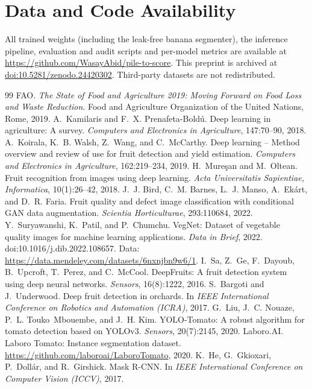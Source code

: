 \documentclass[10pt,twocolumn]{article}
\begin{document}
\section*{Data and Code Availability}
All trained weights (including the leak-free banana segmenter), the inference pipeline, evaluation and audit scripts and per-model metrics are available at \url{https://github.com/WasayAbid/pile-to-score}. This preprint is archived at \href{https://doi.org/10.5281/zenodo.24420302}{doi:10.5281/zenodo.24420302}. Third-party datasets are not redistributed.

\small
\begin{thebibliography}{99}
 FAO. \emph{The State of Food and Agriculture 2019: Moving Forward on Food Loss and Waste Reduction}. Food and Agriculture Organization of the United Nations, Rome, 2019.
 A.~Kamilaris and F.~X. Prenafeta-Bold\'u. Deep learning in agriculture: A survey. \emph{Computers and Electronics in Agriculture}, 147:70--90, 2018.
 A.~Koirala, K.~B. Walsh, Z.~Wang, and C.~McCarthy. Deep learning -- Method overview and review of use for fruit detection and yield estimation. \emph{Computers and Electronics in Agriculture}, 162:219--234, 2019.
 H.~Mure\c{s}an and M.~Oltean. Fruit recognition from images using deep learning. \emph{Acta Universitatis Sapientiae, Informatica}, 10(1):26--42, 2018.
 J.~J. Bird, C.~M. Barnes, L.~J. Manso, A.~Ek\'art, and D.~R. Faria. Fruit quality and defect image classification with conditional GAN data augmentation. \emph{Scientia Horticulturae}, 293:110684, 2022.
 Y.~Suryawanshi, K.~Patil, and P.~Chumchu. VegNet: Dataset of vegetable quality images for machine learning applications. \emph{Data in Brief}, 2022. doi:10.1016/j.dib.2022.108657. Data: \url{https://data.mendeley.com/datasets/6nxnjbn9w6/1}.
 I.~Sa, Z.~Ge, F.~Dayoub, B.~Upcroft, T.~Perez, and C.~McCool. DeepFruits: A fruit detection system using deep neural networks. \emph{Sensors}, 16(8):1222, 2016.
 S.~Bargoti and J.~Underwood. Deep fruit detection in orchards. In \emph{IEEE International Conference on Robotics and Automation (ICRA)}, 2017.
 G.~Liu, J.~C. Nouaze, P.~L. Touko~Mbouembe, and J.~H. Kim. YOLO-Tomato: A robust algorithm for tomato detection based on YOLOv3. \emph{Sensors}, 20(7):2145, 2020.
 Laboro.AI. Laboro Tomato: Instance segmentation dataset. \url{https://github.com/laboroai/LaboroTomato}, 2020.
 K.~He, G.~Gkioxari, P.~Doll\'ar, and R.~Girshick. Mask R-CNN. In \emph{IEEE International Conference on Computer Vision (ICCV)}, 2017.

\end{thebibliography}
\end{document}
